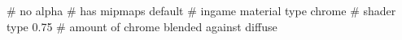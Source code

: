 # no alpha
# has mipmaps
default			 # ingame material type
chrome		         # shader type
0.75			 # amount of chrome blended against diffuse



